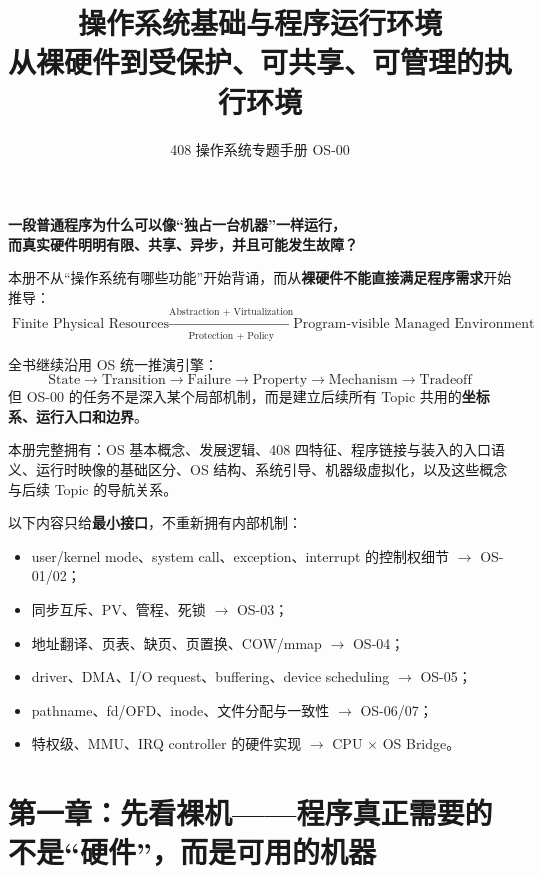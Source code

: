 \documentclass[11pt,a4paper]{ctexart}
\title{\vspace{-1.2cm}\textbf{操作系统基础与程序运行环境}\\[0.4em]
\large 从裸硬件到受保护、可共享、可管理的执行环境}
\author{408 操作系统专题手册 OS-00}
\date{}
\newcommand{\kw}[1]{\textbf{#1}}
\begin{document}
\maketitle

\begin{corebox}
\begin{center}
\Large\bfseries 一段普通程序为什么可以像“独占一台机器”一样运行，\\
而真实硬件明明有限、共享、异步，并且可能发生故障？
\end{center}

本册不从“操作系统有哪些功能”开始背诵，而从\kw{裸硬件不能直接满足程序需求}开始推导：
\[
\boxed{
\text{Finite Physical Resources}
\xrightarrow[\text{Protection + Policy}]{\text{Abstraction + Virtualization}}
\text{Program-visible Managed Environment}
}
\]

全书继续沿用 OS 统一推演引擎：
\[
\boxed{
\text{State}\to\text{Transition}\to\text{Failure}\to\text{Property}\to\text{Mechanism}\to\text{Tradeoff}
}
\]
但 OS-00 的任务不是深入某个局部机制，而是建立后续所有 Topic 共用的\kw{坐标系、运行入口和边界}。
\end{corebox}

\begin{method}
本册完整拥有：OS 基本概念、发展逻辑、408 四特征、程序链接与装入的入口语义、运行时映像的基础区分、OS 结构、系统引导、机器级虚拟化，以及这些概念与后续 Topic 的导航关系。

以下内容只给\kw{最小接口}，不重新拥有内部机制：
\begin{itemize}
  \item user/kernel mode、system call、exception、interrupt 的控制权细节 $\rightarrow$ OS-01/02；
  \item 同步互斥、PV、管程、死锁 $\rightarrow$ OS-03；
  \item 地址翻译、页表、缺页、页置换、COW/mmap $\rightarrow$ OS-04；
  \item driver、DMA、I/O request、buffering、device scheduling $\rightarrow$ OS-05；
  \item pathname、fd/OFD、inode、文件分配与一致性 $\rightarrow$ OS-06/07；
  \item 特权级、MMU、IRQ controller 的硬件实现 $\rightarrow$ CPU $\times$ OS Bridge。
\end{itemize}
\end{method}

\tableofcontents
\newpage

\section{第一章：先看裸机——程序真正需要的不是“硬件”，而是可用的机器}
\end{document}

